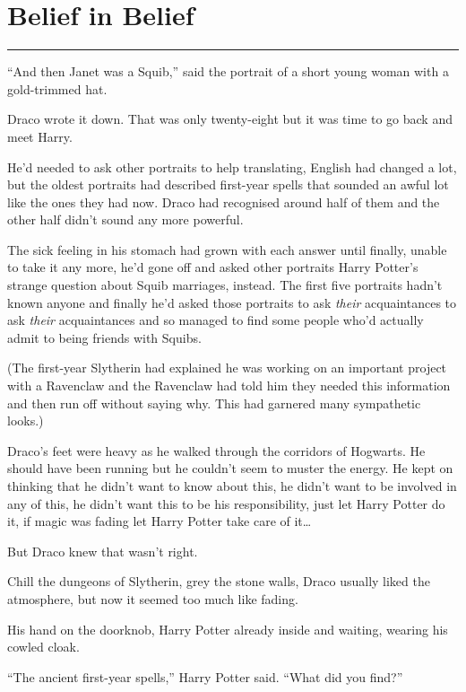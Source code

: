 \chapter{Belief in Belief}

\begin{center}\rule{3in}{0.4pt}\end{center}

``And then Janet was a Squib,'' said the portrait of a short young woman
with a gold-trimmed hat.

Draco wrote it down. That was only twenty-eight but it was time to go
back and meet Harry.

He'd needed to ask other portraits to help translating, English had
changed a lot, but the oldest portraits had described first-year spells
that sounded an awful lot like the ones they had now. Draco had
recognised around half of them and the other half didn't sound any more
powerful.

The sick feeling in his stomach had grown with each answer until
finally, unable to take it any more, he'd gone off and asked other
portraits Harry Potter's strange question about Squib marriages,
instead. The first five portraits hadn't known anyone and finally he'd
asked those portraits to ask \emph{their} acquaintances to ask
\emph{their} acquaintances and so managed to find some people who'd
actually admit to being friends with Squibs.

(The first-year Slytherin had explained he was working on an important
project with a Ravenclaw and the Ravenclaw had told him they needed this
information and then run off without saying why. This had garnered many
sympathetic looks.)

Draco's feet were heavy as he walked through the corridors of Hogwarts.
He should have been running but he couldn't seem to muster the energy.
He kept on thinking that he didn't want to know about this, he didn't
want to be involved in any of this, he didn't want this to be his
responsibility, just let Harry Potter do it, if magic was fading let
Harry Potter take care of it\ldots{}

But Draco knew that wasn't right.

Chill the dungeons of Slytherin, grey the stone walls, Draco usually
liked the atmosphere, but now it seemed too much like fading.

His hand on the doorknob, Harry Potter already inside and waiting,
wearing his cowled cloak.

``The ancient first-year spells,'' Harry Potter said. ``What did you
find?''

